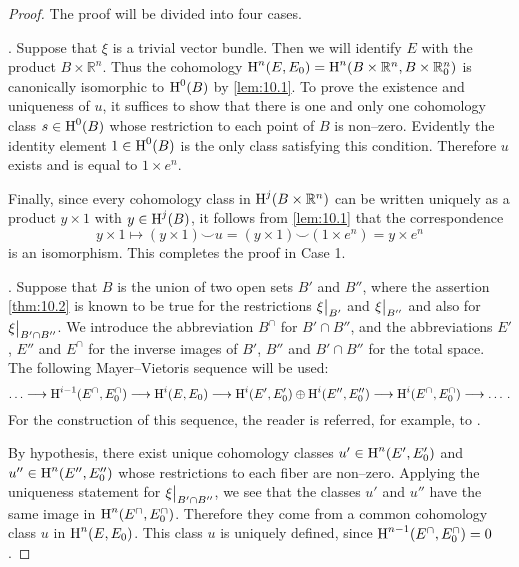 \documentclass[../main]{subfiles}
\begin{document}
\begin{proof}
The proof will be divided into four cases.

. Suppose that $\xi$ is a trivial vector bundle. Then we will identify $E$ with the product $B \times {\mathbb R}^n$. Thus the cohomology $\operatorname{H}^n(E, E_0) = \operatorname{H}^n(B \times {\mathbb R}^n, B \times {\mathbb R}^n_0)$ is canonically isomorphic to $\operatorname{H}^0(B)$ by \ref{lem:10.1}. To prove the existence and uniqueness of $u$, it suffices to show that there is one and only one cohomology class $s \in \operatorname{H}^0(B)$ whose restriction to each point of $B$ is non--zero. Evidently the identity element $1 \in \operatorname{H}^0(B)$ is the only class satisfying this condition. Therefore $u$ exists and is equal to $1 \times e^n$. 

Finally, since every cohomology class in $\operatorname{H}^j(B \times {\mathbb R}^n)$ can be written uniquely as a product $y \times 1$ with $y \in \operatorname{H}^j(B)$, it follows from \ref{lem:10.1} that the correspondence \[y \times 1 \mapsto (y \times 1) \smile u = (y \times 1) \smile (1 \times e^n) = y \times e^n\] is an isomorphism. This completes the proof in Case 1.

. Suppose that $B$ is the union of two open sets $B'$ and $B''$, where the assertion \ref{thm:10.2} is known to be true for the restrictions $\xi \big{|}_{B'}$ and $\xi \big{|}_{B''}$ and also for $\xi \big{|}_{B' \cap B''}$. We introduce the abbreviation $B^\cap$ for $B' \cap B''$, and the abbreviations $E'$, $E''$ and $E^\cap$ for the inverse images of $B'$, $B''$ and $B' \cap B''$ for the total space. The following Mayer--Vietoris sequence will be used: \[\ldots \longrightarrow \operatorname{H}^{i - 1}(E^\cap, E_0^\cap) \longrightarrow \operatorname{H}^i(E, E_0) \longrightarrow \operatorname{H}^i(E', E'_0) \oplus \operatorname{H}^i(E'', E''_0) \longrightarrow \operatorname{H}^i(E^\cap, E_0^\cap) \longrightarrow \ldots\, .\] For the construction of this sequence, the reader is referred, for example, to \cite[pp. 190,239]{spanier1981}. 

By hypothesis, there exist unique cohomology classes $u' \in \operatorname{H}^n(E', E_0')$ and $u'' \in \operatorname{H}^n(E'', E_0'')$ whose restrictions to each fiber are non--zero. Applying the uniqueness statement for $\xi \big{|}_{B' \cap B''}$, we see that the classes $u'$ and $u''$ have the same image in $\operatorname{H}^n(E^\cap, E_0^\cap)$. Therefore they come from a common cohomology class $u$ in $\operatorname{H}^n(E, E_0)$. This class $u$ is uniquely defined, since $\operatorname{H}^{n - 1}(E^\cap, E_0^\cap) = 0$. 


\end{proof}
\end{document}
